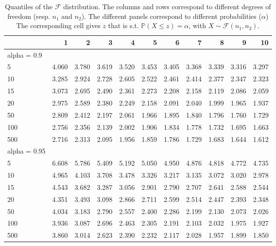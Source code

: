 \documentclass[
]{book}
\theoremstyle{definition}
\theoremstyle{definition}
\theoremstyle{definition}
\theoremstyle{definition}
\theoremstyle{remark}
\begin{document}
\begin{table}

\caption{\label{tab:Fstat}Quantiles of the $\mathcal{F}$ distribution. The columns and rows correspond to different degrees of freedom (resp. $n_1$ and $n_2$). The different panels correspond to different probabilities ($\alpha$) The corresponding cell gives $z$ that is s.t. $\mathbb{P}(X \le z)=\alpha$, with $X \sim \mathcal{F}(n_1,n_2)$.}
\centering
\begin{tabular}[t]{l|r|r|r|r|r|r|r|r|r|r}
\hline
  & 1 & 2 & 3 & 4 & 5 & 6 & 7 & 8 & 9 & 10\\
\hline
alpha = 0.9 &  &  &  &  &  &  &  &  &  & \\
\hline
5 & 4.060 & 3.780 & 3.619 & 3.520 & 3.453 & 3.405 & 3.368 & 3.339 & 3.316 & 3.297\\
\hline
10 & 3.285 & 2.924 & 2.728 & 2.605 & 2.522 & 2.461 & 2.414 & 2.377 & 2.347 & 2.323\\
\hline
15 & 3.073 & 2.695 & 2.490 & 2.361 & 2.273 & 2.208 & 2.158 & 2.119 & 2.086 & 2.059\\
\hline
20 & 2.975 & 2.589 & 2.380 & 2.249 & 2.158 & 2.091 & 2.040 & 1.999 & 1.965 & 1.937\\
\hline
50 & 2.809 & 2.412 & 2.197 & 2.061 & 1.966 & 1.895 & 1.840 & 1.796 & 1.760 & 1.729\\
\hline
100 & 2.756 & 2.356 & 2.139 & 2.002 & 1.906 & 1.834 & 1.778 & 1.732 & 1.695 & 1.663\\
\hline
500 & 2.716 & 2.313 & 2.095 & 1.956 & 1.859 & 1.786 & 1.729 & 1.683 & 1.644 & 1.612\\
\hline
alpha = 0.95 &  &  &  &  &  &  &  &  &  & \\
\hline
5 & 6.608 & 5.786 & 5.409 & 5.192 & 5.050 & 4.950 & 4.876 & 4.818 & 4.772 & 4.735\\
\hline
10 & 4.965 & 4.103 & 3.708 & 3.478 & 3.326 & 3.217 & 3.135 & 3.072 & 3.020 & 2.978\\
\hline
15 & 4.543 & 3.682 & 3.287 & 3.056 & 2.901 & 2.790 & 2.707 & 2.641 & 2.588 & 2.544\\
\hline
20 & 4.351 & 3.493 & 3.098 & 2.866 & 2.711 & 2.599 & 2.514 & 2.447 & 2.393 & 2.348\\
\hline
50 & 4.034 & 3.183 & 2.790 & 2.557 & 2.400 & 2.286 & 2.199 & 2.130 & 2.073 & 2.026\\
\hline
100 & 3.936 & 3.087 & 2.696 & 2.463 & 2.305 & 2.191 & 2.103 & 2.032 & 1.975 & 1.927\\
\hline
500 & 3.860 & 3.014 & 2.623 & 2.390 & 2.232 & 2.117 & 2.028 & 1.957 & 1.899 & 1.850\\

\end{tabular}
\end{table}
\end{document}

